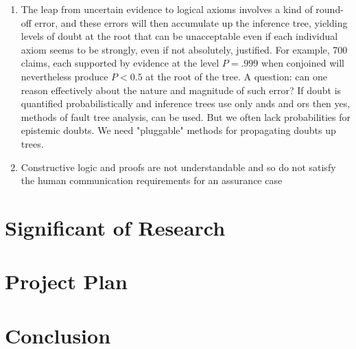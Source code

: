 \documentclass{article} %
\begin{document}
\begin{enumerate}
\item
The leap from uncertain evidence to logical axioms involves a kind of round-off error, and these errors will then accumulate up the inference tree, yielding levels of doubt at the root that can be unacceptable even if each individual axiom seems to be strongly, even if not absolutely, justified. For example, 700 claims, each supported by evidence at the level $P=.999$ when conjoined will nevertheless produce $P <0.5$ at the root of the tree. A question: can one reason effectively about the nature and magnitude of such error? If doubt is quantified probabilistically and inference trees use only ands and ors then yes, methods of fault tree analysis, can be used. But we often lack probabilities for epistemic doubts. We need "pluggable" methods for propagating doubts up trees.
\item
Constructive logic and proofs are not understandable and so do not satisfy the human communication requirements for an assurance case
\end{enumerate}


\section{Significant of Research}

\section{Project Plan}
\section{Conclusion}
\end{document}

